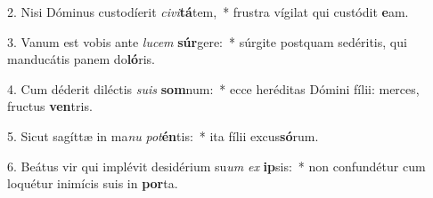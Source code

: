 2. Nisi Dóminus custodíerit \textit{ci}\textit{vi}\textbf{tá}tem,~*  frustra vígilat qui custódit \textbf{e}am.\

3. Vanum est vobis ante \textit{lu}\textit{cem} \textbf{súr}gere:~*  súrgite postquam sedéritis, qui manducátis panem do\textbf{ló}ris.\

4. Cum déderit diléctis \textit{su}\textit{is} \textbf{som}num:~*  ecce heréditas Dómini fílii: merces, fructus \textbf{ven}tris.\

5. Sicut sagíttæ in ma\textit{nu} \textit{pot}\textbf{én}tis:~*  ita fílii excus\textbf{só}rum.\

6. Beátus vir qui implévit desidérium su\textit{um} \textit{ex} \textbf{ip}sis:~*  non confundétur cum loquétur inimícis suis in \textbf{por}ta.\

